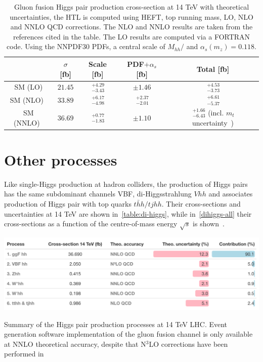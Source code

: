 \begin{table}
	\centering
	\begin{tabular}{ccccc}
		\toprule
		& $ \sigma$	[fb] & Scale [fb] & PDF$+\alpha_s$ [fb]& Total [fb] \\
		\midrule
		SM    (LO)  &  $ 21.45$    &   $ \,^{+4.29}_{-3.43}$   & $\pm 1.46$   &  $ \,^{+4.53}_{-3.73}$ \\
		SM   (NLO)~\cite{Baglio:2012np}  &  $ 33.89$   &   $ \,^{+6.17}_{-4.98}$   & $ \,^{+2.37}_{-2.01}$   &  $ \,^{+6.61}_{-5.37}$ \\
		SM   (NNLO)~\cite{Grazzini:2018bsd}  &  $36.69$    &    $ \,^{+0.77}_{-1.83}$   & $\pm 1.10$   &  $ \,^{+1.66}_{-6.43}$ {\tiny(incl. $m_t$ uncertainty~\cite{Baglio:2020wgt})} \\
		\bottomrule
	\end{tabular}
	\caption{Gluon fusion Higgs pair production cross-section at 14 TeV with theoretical  uncertainties, the HTL is computed using HEFT, top running mass, LO, NLO and NNLO QCD corrections. The NLO and NNLO results are taken from the references cited in the table. The LO results are computed via a FORTRAN code. Using the NNPDF30 PDFs\cite{Ball:2017nwa}, a central scale of $ M_{hh}/$ and $ \alpha_s(m_z) = 0.118$.}
	\label{ggf_xsres}
\end{table}

\section{Other processes\label{otherhh}  }
Like single-Higgs production at hadron colliders, the production of Higgs pairs has the same subdominant channels VBF, di-Higgsstrahlung $ Vhh$ and associates production of Higgs pair with top quarks $t\bar hh /t j hh$. Their cross-sections and uncertainties at 14 TeV are shown in~\autoref{table:di-higgs}, while in~\autoref{dihiggs-all} their cross-sections as a function of the centre-of-mass energy $\sqrt{s}$ is shown~\cite{DiMicco:2019ngk}. 
\begin{table}[htbp!]
	\includegraphics[width=1\textwidth]{hh-table}
	\caption{ Summary of the Higgs pair production processes at 14 TeV LHC. Event generation software implementation of the gluon fusion channel is only available at NNLO theoretical accuracy, despite that N$^3$LO corrections have been performed in~\cite{Chen:2019fhs} \label{table:di-higgs} }
\end{table}
